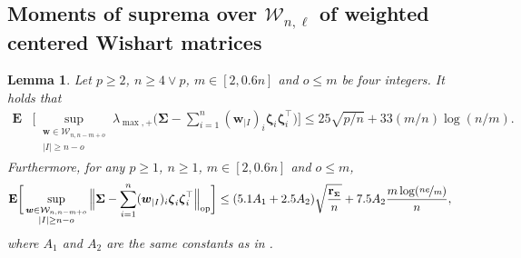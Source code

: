 \documentclass[aos,preprint,reqno]{imsart}
\newcommand\bzeta{\boldsymbol\zeta}
\newcommand\bSigma{\boldsymbol\Sigma}
\newcommand\bfE{\mathbf E}
\newcommand\bw{\boldsymbol w}
\newcommand\rSigma{\textbf{\textup{r}}_{\scriptscriptstyle\bSigma}}
\theoremstyle{plain}
\newtheorem{lemma}{Lemma}
\theoremstyle{remark}
\begin{document}
	\subsection{Moments of suprema over $\mathcal W_{n,\ell}$ of weighted 
	centered Wishart matrices}
	
	\begin{lemma}\label{lemma3}
	Let $p\ge 2$, $n\ge 4\vee p$, $m\in[2,0.6n]$ and $o\le m$ be four integers. 
	It holds that
	\begin{align}
			\bfE&\Bigg[\sup_{\substack{\bw\in \mathcal W_{n,n-m+o} \\ |I| \ge n-o}} 
			\lambda_{\max,+}\Big(\bSigma - \sum_{i=1}^n (\bw_{|I})_i\bzeta_i\bzeta_i^\top\Big
			)\Bigg] \le 25\sqrt{p/n} + 33(m/n) \log({n}/{m}).
	\end{align}
	Furthermore, for any $p\ge 1$, $n\ge 1$, $m\in[2,0.6n]$ and $o\le m$,
	\begin{align}
			\bfE&\bigg[\sup_{\substack{\bw\in \mathcal W_{n,n-m+o} \\ |I| \ge n-o}}  
			\Big\|\bSigma - \sum_{i=1}^n (\bw_{|I})_i\bzeta_i\bzeta_i^\top
			\Big\|_{\textup{op}}\bigg] \le (5.1A_1 + 2.5 A_2)\sqrt{\frac{\rSigma}{n}} 
			+ 7.5A_2 \frac{m \log(\nicefrac{ne}{m})}{n},			
	\end{align}
	where $A_1$ and $A_2$ are the same constants as in .
	\end{lemma}
\end{document}
